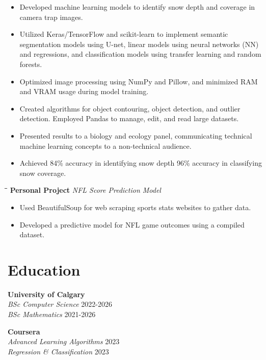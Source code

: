 \documentclass[a4paper,11pt]{article}
\def\jobh{\hspace{-1ex}}
\def\locationh{\hspace{7cm}}
\def\dateh{\hspace{10cm}}
\def\subsectionv{\vspace{-5ex}}
\def\postpointsv{\vspace{0cm}}
\begin{document}
\begin{itemize}[leftmargin=.5cm, itemsep=.1cm, before=\subsectionv, after=\postpointsv]
    \item Developed machine learning models to identify snow depth and coverage in camera trap images.
    \item Utilized Keras/TensorFlow and scikit-learn to implement semantic segmentation models using U-net, linear models using neural networks (NN) and regressions, and classification models using transfer learning and random forests.
    \item Optimized image processing using NumPy and Pillow, and minimized RAM and VRAM usage during model training.
    \item Created algorithms for object contouring, object detection, and outlier detection. Employed Pandas to manage, edit, and read large datasets.
    \item Presented results to a biology and ecology panel, communicating technical machine learning concepts to a non-technical audience.
    \item Achieved 84\% accuracy in identifying snow depth 96\% accuracy in classifying snow coverage.
\end{itemize}

\vspace{0.5cm}

\begin{tabbing}
    \jobh \= \locationh \= \dateh \= \kill
    \> \textbf{Personal Project} \> \textit{NFL Score Prediction Model} \\
\end{tabbing}

\begin{itemize}[leftmargin=.5cm, itemsep=.1cm, before=\subsectionv, after=\postpointsv]
    \item Used BeautifulSoup for web scraping sports stats websites to gather data.
    \item Developed a predictive model for NFL game outcomes using a compiled dataset.
\end{itemize}

\vspace{0.2cm}

\section*{Education}

\noindent
\begin{minipage}[t]{0.45\textwidth} %
    \textbf{University of Calgary} \\
    \textit{BSc Computer Science} \hfill 2022-2026 \\
    \textit{BSc Mathematics} \hfill 2021-2026
\end{minipage}
\hfill %
\begin{minipage}[t]{0.45\textwidth} %
    \textbf{Coursera} \\
    \textit{Advanced Learning Algorithms} \hfill 2023 \\
    \textit{Regression \& Classification} \hfill 2023
\end{minipage}
\end{document}
